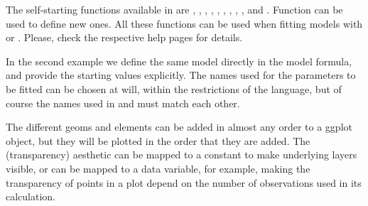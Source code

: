 \documentclass[krantz2]{krantz}\usepackage{knitr}%
\begin{document}
The self-starting functions available in \Rlang are , , , , , , , , , and . Function  can be used to define new ones. All these functions can be used when fitting models with  or . Please, check the respective help pages for details.

In the second example we define the same model directly in the model formula, and provide the starting values explicitly. The names used for the parameters to be fitted can be chosen at will, within the restrictions of the \Rlang language, but of course the names used in  and  must match each other.

\begin{knitrout}\footnotesize
{}\color{fgcolor}\begin{kframe}
\begin{alltt}
    \hlopt{+}
  \hlstd{()} \hlopt{+}
  \hlstd{(} \hlstd{=} \hlstd{,}
               \hlstd{=} \hlstd{(}  \hlopt{~}  \hlopt{*}  \hlopt{/}  \hlopt{+} 
                                  \hlstd{=} \hlstd{(} \hlstd{=} \hlstd{,}  \hlstd{=} \hlstd{)),}
               \hlstd{=} \hlstd{)}
\end{alltt}
\end{kframe}
\end{knitrout}

\begin{warningbox}
The different geoms and elements can be added in almost any order to a ggplot object, but they will be plotted in the order that they are added. The  (transparency) aesthetic can be mapped to a constant to make underlying layers visible, or  can be mapped to a data variable, for example, making the transparency of points in a plot depend on the number of observations used in its calculation.

\begin{knitrout}\footnotesize
{}\color{fgcolor}\begin{kframe}
\begin{alltt}
\hlstd{(}  \hlstd{(}     \hlstd{=}  \hlopt{+}
  \hlstd{(} \hlstd{=} \hlstd{)} \hlopt{+}
  \hlstd{(} \hlstd{=} \hlstd{)} \hlopt{+}
  \hlstd{()}
\end{alltt}
\end{kframe}
\end{knitrout}
\end{warningbox}
\end{document}
